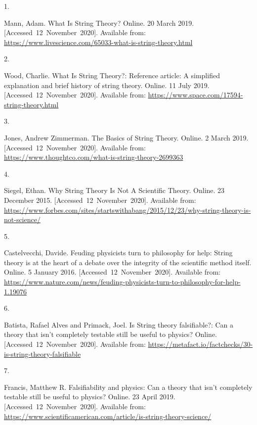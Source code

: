 \documentclass[
  a4paper,
]{article}
\newlength{\cslhangindent}
\newlength{\csllabelwidth}
\newlength{\cslentryspacingunit} %
\newenvironment{CSLReferences}[2] %
 {%
  \setlength{\parindent}{0pt}
  \ifodd #1
  \let\oldpar\par
  \def\par{\hangindent=\cslhangindent\oldpar}
  \fi
  \setlength{\parskip}{#2\cslentryspacingunit}
 }%
 {}
\newcommand{\CSLLeftMargin}[1]{\parbox[t]{\csllabelwidth}{#1}}
\newcommand{\CSLRightInline}[1]{\parbox[t]{\linewidth - \csllabelwidth}{#1}\break}
\begin{document}
\hypertarget{refs}{}
\begin{CSLReferences}{0}{0}
\leavevmode{}%
\CSLLeftMargin{1. }%
\CSLRightInline{Mann, Adam. {What Is String Theory?} Online. 20 March
2019. {[}Accessed~12~November~2020{]}. Available from:
\url{https://www.livescience.com/65033-what-is-string-theory.html}}

\leavevmode{}%
\CSLLeftMargin{2. }%
\CSLRightInline{Wood, Charlie. {What Is String Theory?}: Reference
article: A simplified explanation and brief history of string theory.
Online. 11 July 2019. {[}Accessed~12~November~2020{]}. Available from:
\url{https://www.space.com/17594-string-theory.html}}

\leavevmode{}%
\CSLLeftMargin{3. }%
\CSLRightInline{Jones, Andrew Zimmerman. {The Basics of String Theory}.
Online. 2 March 2019. {[}Accessed~12~November~2020{]}. Available from:
\url{https://www.thoughtco.com/what-is-string-theory-2699363}}

\leavevmode{}%
\CSLLeftMargin{4. }%
\CSLRightInline{Siegel, Ethan. {Why String Theory Is Not A Scientific
Theory}. Online. 23 December 2015. {[}Accessed~12~November~2020{]}.
Available from:
\url{https://www.forbes.com/sites/startswithabang/2015/12/23/why-string-theory-is-not-science/}}

\leavevmode{}%
\CSLLeftMargin{5. }%
\CSLRightInline{Castelvecchi, Davide. {Feuding physicists turn to
philosophy for help}: String theory is at the heart of a debate over the
integrity of the scientific method itself. Online. 5 January 2016.
{[}Accessed~12~November~2020{]}. Available from:
\url{https://www.nature.com/news/feuding-physicists-turn-to-philosophy-for-help-1.19076}}

\leavevmode{}%
\CSLLeftMargin{6. }%
\CSLRightInline{Batista, Rafael Alves and Primack, Joel. {Is String
theory falsifiable?}: Can a theory that isn't completely testable still
be useful to physics? Online. {[}Accessed~12~November~2020{]}. Available
from:
\url{https://metafact.io/factchecks/30-is-string-theory-falsifiable}}

\leavevmode{}%
\CSLLeftMargin{7. }%
\CSLRightInline{Francis, Matthew R. {Falsifiability and physics}: Can a
theory that isn't completely testable still be useful to physics?
Online. 23 April 2019. {[}Accessed~12~November~2020{]}. Available from:
\url{https://www.scientificamerican.com/article/is-string-theory-science/}}


\end{CSLReferences}
\end{document}
